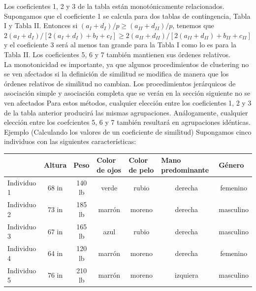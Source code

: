 \documentclass[a4paper, 20pt]{article}
\begin{document}
Los coeficientes 1, 2 y 3 de la tabla están monotónicamente relacionados. Supongamos que el coeficiente 1 se calcula para dos tablas de contingencia, Tabla I y Tabla II. Entonces si $(a_I+d_I)/p \geq (a_{II}+d_{II})/p$, tenemos que $2(a_I+d_I)/[2(a_I+d_I)+b_I+c_I] \geq 2(a_{II}+d_{II})/[2(a_{II}+d_{II})+b_{II}+c_{II}]$ y el coeficiente 3 será al menos tan grande para la Tabla I como lo es para la Tabla II. Los coeficientes 5, 6 y 7 también mantienen sus órdenes relativos.\\

La monotonicidad es importante, ya que algunos procedimientos de clustering no se ven afectados si la definición de similitud se modifica de manera que los órdenes relativos de similitud no cambian. Los procedimientos jerárquicos de asociación simple y asociación completa que se verán en la sección siguiente no se ven afectados Para estos métodos, cualquier elección entre los coeficientes 1, 2 y 3 de la tabla anterior producirá las mismas agrupaciones. Análogamente, cualquier elección entre los coefcientes 5, 6 y 7 también resultará en agrupaciones idénticas.\\

Ejemplo (Calculando los valores de un coeficiente de similitud) Supongamos cinco individuos con las siguientes características:

\begin{table}[h]
\centering
\resizebox{15cm}{!} {
\begin{tabular}{l|cccccc}
            & \multicolumn{1}{l}{Altura} & \multicolumn{1}{l}{Peso} & \multicolumn{1}{l}{Color de ojos} & \multicolumn{1}{l}{Color de pelo} & \multicolumn{1}{l}{Mano predominante} & \multicolumn{1}{l}{Género} \\ \hline
Individuo 1 & 68 in                      & 140 lb                   & verde                             & rubio                             & derecha                               & femenino                   \\
Individuo 2 & 73 in                      & 185 lb                   & marrón                            & moreno                            & derecha                               & masculino                  \\
Individuo 3 & 67 in                      & 165 lb                   & azul                              & rubio                             & derecha                               & masculino                  \\
Individuo 4 & 64 in                      & 120 lb                   & marrón                            & moreno                            & derecha                               & femenino                   \\
Individuo 5 & 76 in                      & 210 lb                   & marrón                            & moreno                            & izquiera                              & masculino                 
\end{tabular}
}
\end{table}
\end{document}
